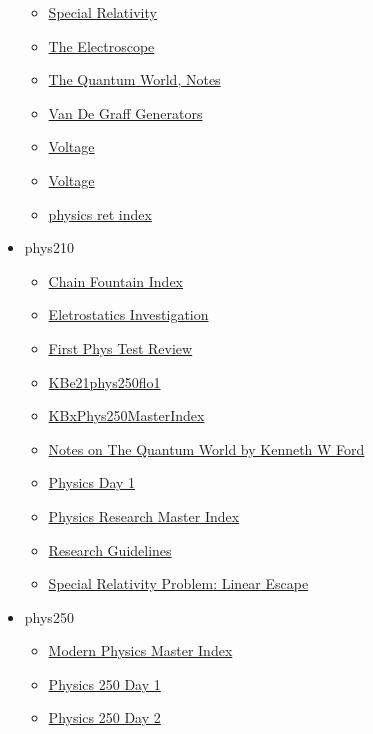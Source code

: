 \documentclass[11pt]{article}
\begin{document}
\begin{itemize}
\begin{itemize}
\item \href{phys201/KbhPHYS201SpecialRelativity.org}{Special Relativity}
\item \href{phys201/KBhPHYS201Electroscope.org}{The Electroscope}
\item \href{phys201/KBhPHYS201QuantumWorldBook.org}{The Quantum World, Notes}
\item \href{phys201/KBhPHYS201VanDeGraff.org}{Van De Graff Generators}
\item \href{phys201/KBhPHYS201Voltage.org}{Voltage}
\item \href{phys201/KBe20phys201refVoltage.org}{Voltage}
\item \href{phys201/exr0n20phys201retIndex.org}{physics ret index}
\end{itemize}
\item phys210
\begin{itemize}
\item \href{phys210/KBhPHYS210ChainFountainIndex.org}{Chain Fountain Index}
\item \href{phys210/KBxElectrostaticsInvestigation.org}{Eletrostatics Investigation}
\item \href{phys210/KBxFirstPhysTestReview.org}{First Phys Test Review}
\item \href{phys210/KBe21phys250flo1.org}{KBe21phys250flo1}
\item \href{phys210/KBxPhys250MasterIndex.org}{KBxPhys250MasterIndex}
\item \href{phys210/KBe21phys250floTheQuantumWorldBook.org}{Notes on The Quantum World by Kenneth W Ford}
\item \href{phys210/KBhPHYS210Day1.org}{Physics Day 1}
\item \href{phys210/KBPHYS210MasterIndex.org}{Physics Research Master Index}
\item \href{phys210/KBhPHYS210Guidelines.org}{Research Guidelines}
\item \href{phys210/KBe21phys250retSpecialRelativityProblem.org}{Special Relativity Problem: Linear Escape}
\end{itemize}
\item phys250
\begin{itemize}
\item \href{phys250/KBPHYS250MasterIndex.org}{Modern Physics Master Index}
\item \href{phys250/KBdPHYS250Day1.org}{Physics 250 Day 1}
\item \href{phys250/KBdPHYS250Day2.org}{Physics 250 Day 2}
\end{itemize}

\end{itemize}
\end{document}
